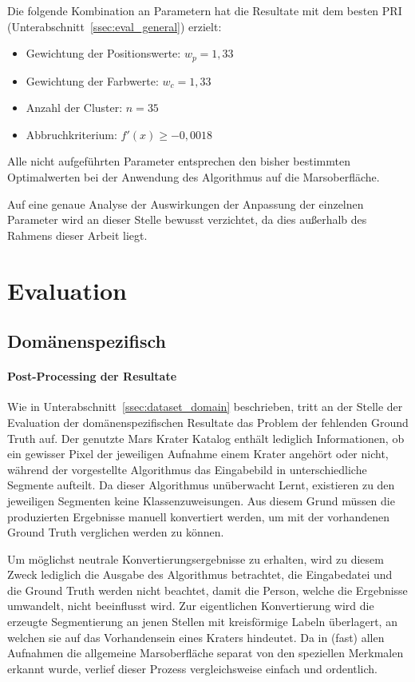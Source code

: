 Die folgende Kombination an Parametern hat die Resultate mit dem besten PRI (\vgl Unterabschnitt~\ref{ssec:eval_general}) erzielt:

\begin{itemize}
	\item{Gewichtung der Positionswerte:} $w_p = 1,33$
	\item{Gewichtung der Farbwerte:} $w_c = 1,33$
	\item{Anzahl der Cluster:} $n = 35$
	\item{Abbruchkriterium:} $f'(x) \geq -0,0018$
\end{itemize}

Alle nicht aufgeführten Parameter entsprechen den bisher bestimmten Optimalwerten bei der Anwendung des Algorithmus auf die Marsoberfläche.

Auf eine genaue Analyse der Auswirkungen der Anpassung der einzelnen Parameter wird an dieser Stelle bewusst verzichtet, da dies außerhalb des Rahmens dieser Arbeit liegt.

\section{Evaluation}
\label{sec:evaluation}

\subsection{Domänenspezifisch}
\label{ssec:evaluation_domain}

\paragraph{Post-Processing der Resultate}
\label{ssec:postprocessing}

Wie in Unterabschnitt~\ref{ssec:dataset_domain} beschrieben, tritt an der Stelle der Evaluation der domänenspezifischen Resultate das Problem der fehlenden Ground Truth auf. Der genutzte Mars Krater Katalog \cite{robbins_12} enthält lediglich Informationen, ob ein gewisser Pixel der jeweiligen Aufnahme einem Krater angehört oder nicht, während der vorgestellte Algorithmus das Eingabebild in unterschiedliche Segmente aufteilt. Da dieser Algorithmus unüberwacht Lernt, existieren zu den jeweiligen Segmenten keine Klassenzuweisungen. Aus diesem Grund müssen die produzierten Ergebnisse manuell konvertiert werden, um mit der vorhandenen Ground Truth verglichen werden zu können.

Um möglichst neutrale Konvertierungsergebnisse zu erhalten, wird zu diesem Zweck lediglich die Ausgabe des Algorithmus betrachtet, die Eingabedatei und die Ground Truth werden nicht beachtet, damit die Person, welche die Ergebnisse umwandelt, nicht beeinflusst wird. Zur eigentlichen Konvertierung wird die erzeugte Segmentierung an jenen Stellen mit kreisförmige Labeln überlagert, an welchen sie auf das Vorhandensein eines Kraters hindeutet. Da in (fast) allen Aufnahmen die allgemeine Marsoberfläche separat von den speziellen Merkmalen erkannt wurde, verlief dieser Prozess vergleichsweise einfach und ordentlich.

